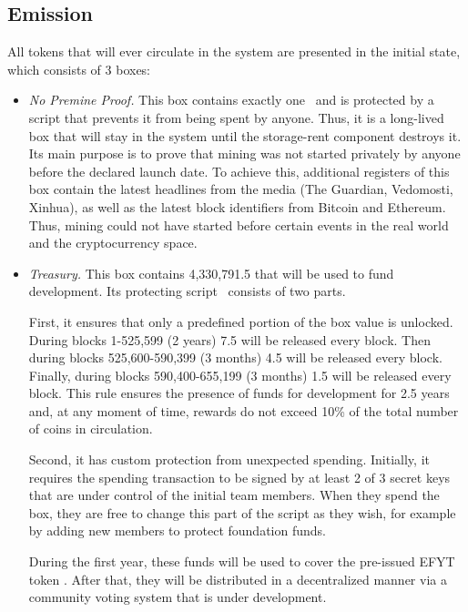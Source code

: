 \subsection{Emission}
\label{sec:emission}


All \Erg{} tokens that will ever circulate in the system are presented in the initial state, which consists of 3 boxes:

\begin{itemize}
    \item{\em No Premine Proof.} This box contains exactly one~\Erg{} and is protected by a script that prevents it from being spent by anyone.
    Thus, it is a long-lived box that will stay in the system until the storage-rent component
    destroys it.
    Its main purpose is to prove that \Ergo{} mining was not started privately by anyone before
    the declared launch date.
    To achieve this, additional registers of this box contain the latest headlines from the media (The Guardian, Vedomosti, Xinhua), as well as the latest block identifiers from Bitcoin and Ethereum.
    Thus, \Ergo{} mining could not have started before certain events in the real world and the cryptocurrency space.

    \item{\em Treasury.} This box contains 4,330,791.5 \Erg{} that will be used to fund \Ergo{}
    development.
    Its protecting script~\cite{scriptTreasury} consists of two parts.

    First, it ensures that only a predefined portion of the box value is unlocked.
    During blocks 1-525,599 (2 years) 7.5 \Erg{} will be released every block. Then during blocks 525,600-590,399 (3 months) 4.5 \Erg{} will be released every block. Finally,
    during blocks 590,400-655,199 (3 months) 1.5 \Erg{} will be released every block.
    This rule ensures the presence of funds for \Ergo{} development for 2.5 years and, at any moment of time,
    rewards do not exceed 10\% of the total number of coins in circulation.

    Second, it has custom protection from unexpected spending.
    Initially, it requires the spending transaction to be signed by at least 2 of 3 secret keys that are under control of the initial team members. When they spend the box, they are free to
    change this part of the script as they wish, for example by adding new members to protect foundation
    funds.

    During the first year, these funds will be used to cover the pre-issued EFYT token
    . After that, they will be distributed in a decentralized manner via a community voting system that is under development.



\end{itemize}
